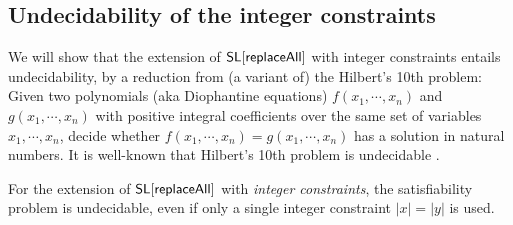%	
 


\subsection{Undecidability of the integer constraints}

We will show that the extension of $\mathsf{SL}[\mathsf{replaceAll}]$ with integer constraints entails undecidability, by a reduction from (a variant of) the Hilbert's 10th problem: Given two polynomials (aka Diophantine equations) $f(x_1, \cdots, x_n)$ and $g(x_1,\cdots, x_n)$ with positive integral coefficients over the same set of variables $x_1, \cdots, x_n$, decide whether $f(x_1, \cdots, x_n)=g(x_1, \cdots, x_n)$ has a solution in natural numbers. It is well-known that Hilbert's 10th problem is undecidable \cite{Mat93}.


\begin{theorem}\label{thm-ext-int}
	For the extension of $\mathsf{SL}[\mathsf{replaceAll}]$ with \emph{integer constraints}, the satisfiability problem is undecidable, even if only a single integer constraint $|x| = |y|$ is used.
\end{theorem}

